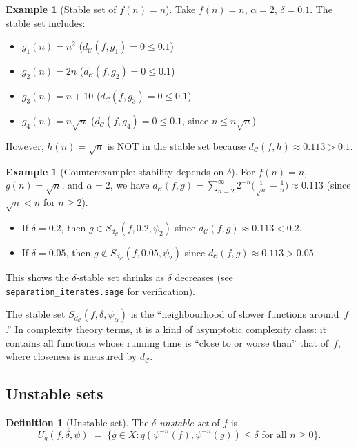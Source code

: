 \documentclass[11pt,a4paper]{article}
\newcommand{\repourl}{https://github.com/guydev42/expansive-homeomorphisms-complexity-qmetric}
\theoremstyle{plain}
\theoremstyle{definition}
\newtheorem{definitioninner}[theoreminner]{Definition}
\newtheorem{exampleinner}[theoreminner]{Example}
\newenvironment{definition}[1][]{\begin{definitioninner}[#1]}{\end{definitioninner}}
\newenvironment{example}[1][]{\begin{exampleinner}[#1]}{\end{exampleinner}}
\newcommand{\C}{\mathcal{C}}
\begin{document}
\begin{example}[Stable set of $f(n)=n$]\label{ex:stable-lin}
Take $f(n)=n$, $\alpha=2$, $\delta=0.1$. The stable set includes:
\begin{itemize}
\item $g_1(n)=n^2$ ($d_\C(f,g_1)=0\le 0.1$)
\item $g_2(n)=2n$ ($d_\C(f,g_2)=0\le 0.1$)
\item $g_3(n)=n+10$ ($d_\C(f,g_3)=0\le 0.1$)
\item $g_4(n)=n\sqrt{n}$ ($d_\C(f,g_4)=0\le 0.1$, since $n\le n\sqrt{n}$)
\end{itemize}
However, $h(n)=\sqrt{n}$ is NOT in the stable set because
$d_\C(f,h)\approx 0.113 > 0.1$.
\end{example}

\begin{example}[Counterexample: stability depends on $\delta$]\label{ex:counter-stable}
For $f(n)=n$, $g(n)=\sqrt{n}$, and $\alpha=2$, we have
$d_\C(f,g)=\sum_{n=2}^\infty 2^{-n}\bigl(\frac{1}{\sqrt{n}}-\frac{1}{n}\bigr)
\approx 0.113$ (since $\sqrt{n}<n$ for $n\ge 2$).
\begin{itemize}
\item If $\delta=0.2$, then $g\in S_{d_\C}(f,0.2,\psi_2)$ since $d_\C(f,g)\approx 0.113 < 0.2$.
\item If $\delta=0.05$, then $g\notin S_{d_\C}(f,0.05,\psi_2)$ since $d_\C(f,g)\approx 0.113 > 0.05$.
\end{itemize}
This shows the $\delta$-stable set shrinks as $\delta$ decreases
(see \href{\repourl/blob/main/code/sagemath/separation_iterates.sage}{\texttt{separation\_iterates.sage}}
for verification).
\end{example}

\begin{insightbox}
The stable set $S_{d_\C}(f,\delta,\psi_\alpha)$ is the
``neighbourhood of slower functions around~$f$.''  In complexity
theory terms, it is a kind of asymptotic complexity class: it
contains all functions whose running time is ``close to or worse
than'' that of~$f$, where closeness is measured by $d_\C$.
\end{insightbox}


\subsection{Unstable sets}

\begin{definition}[Unstable set]\label{def:unstable}
The \emph{$\delta$-unstable set} of $f$ is
\[
  U_q(f,\delta,\psi)
  \;=\; \{g\in X : q(\psi^{-n}(f),\psi^{-n}(g))\le\delta
    \text{ for all }n\ge 0\}.
\]
\end{definition}
\end{document}

